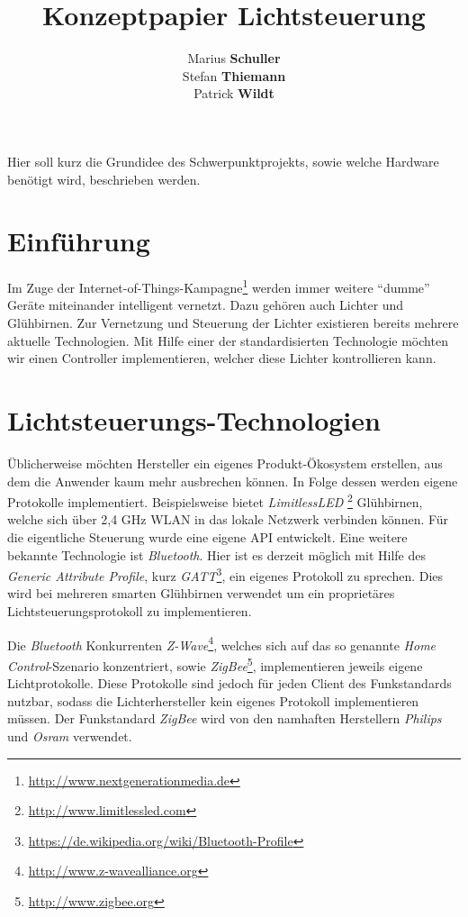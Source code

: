 \documentclass[a4paper,12pt]{article}
\begin{document}
\title{Konzeptpapier Lichtsteuerung}
\author{Marius \textbf{Schuller}\\
        Stefan \textbf{Thiemann}\\
		Patrick \textbf{Wildt}}
\maketitle

\noindent
Hier soll kurz die Grundidee des Schwerpunktprojekts, sowie welche Hardware 
benötigt wird, beschrieben werden.

\section{Einführung}

Im Zuge der Internet-of-Things-Kampagne\footnote{\url{http://www.nextgenerationmedia.de}}
werden immer weitere ``dumme'' Geräte miteinander intelligent vernetzt. Dazu
gehören auch Lichter und Glühbirnen. Zur Vernetzung und Steuerung der Lichter
existieren bereits mehrere aktuelle Technologien. Mit Hilfe einer der
standardisierten Technologie möchten wir einen Controller implementieren,
welcher diese Lichter kontrollieren kann.

\section{Lichtsteuerungs-Technologien}

Üblicherweise möchten Hersteller ein eigenes Produkt-Ökosystem erstellen, aus dem die
Anwender kaum mehr ausbrechen können. In Folge dessen werden eigene Protokolle
implementiert. Beispielsweise bietet \textit{LimitlessLED}
\footnote{\url{http://www.limitlessled.com}} Glühbirnen, welche sich
über 2,4 GHz WLAN in das lokale Netzwerk verbinden können. Für die eigentliche
Steuerung wurde eine eigene API entwickelt. Eine weitere bekannte Technologie ist
\textit{Bluetooth}. Hier ist es derzeit möglich mit Hilfe des \textit{Generic
Attribute Profile}, kurz
\textit{GATT}\footnote{\url{https://de.wikipedia.org/wiki/Bluetooth-Profile}},
ein eigenes Protokoll zu sprechen. Dies wird bei mehreren smarten Glühbirnen
verwendet um ein proprietäres Lichtsteuerungsprotokoll zu implementieren.

\newpage

Die \textit{Bluetooth} Konkurrenten
\textit{Z-Wave}\footnote{\url{http://www.z-wavealliance.org}}, welches sich auf das
so genannte \textit{Home Control}-Szenario konzentriert, sowie
\textit{ZigBee}\footnote{\url{http://www.zigbee.org}},
implementieren jeweils eigene Lichtprotokolle. Diese Protokolle sind jedoch für jeden
Client des Funkstandards nutzbar, sodass die Lichterhersteller kein eigenes Protokoll
implementieren müssen. Der Funkstandard \textit{ZigBee} wird von den namhaften
Herstellern \textit{Philips} und \textit{Osram} verwendet.
\end{document}
